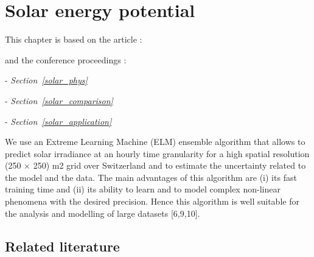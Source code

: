 \chapter{Solar energy potential}
\label{solar}

\vspace{-45pt} %
\begin{tcolorbox}[enhanced,width=\textwidth,size=fbox,
        sharp corners,colframe=black!5!white,drop fuzzy shadow southeast,
        boxrule=3mm, parbox=false] %
This chapter is based on the article \citep{walch_big_2020}:

\qquad {}

and the conference proceedings \cite{walch_spatio-temporal_2019, walch_critical_2019, walch_fast_2019-1}:

\quad {} - \textit{Section~\ref{solar_phys}} 

\quad {} - \textit{Section~\ref{solar_comparison}} 

\quad {} - \textit{Section~\ref{solar_application}} 
\end{tcolorbox}

We use an Extreme Learning Machine (ELM) ensemble algorithm that allows to predict solar irradiance at an hourly time granularity for a high spatial resolution (250 $\times$ 250) m2 grid over Switzerland and to estimate the uncertainty related to the model and the data. The main advantages of this algorithm are (i) its fast training time and (ii) its ability to learn and to model complex non-linear phenomena with the desired precision. Hence this algorithm is well suitable for the analysis and modelling of large datasets [6,9,10].

\section{Related literature}

